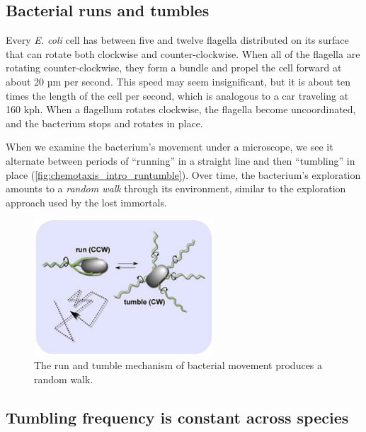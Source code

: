 \subsection{Bacterial runs and tumbles}


Every \textit{E. coli} cell has between five and twelve flagella distributed on its surface that can rotate both clockwise and counter-clockwise. When all of the flagella are rotating counter-clockwise, they form a bundle and propel the cell forward at about 20 µm per second. This speed may seem insignificant, but it is about ten times the length of the cell per second, which is analogous to a car traveling at 160 kph. When a flagellum rotates clockwise, the flagella become uncoordinated, and the bacterium stops and rotates in place.

When we examine the bacterium's movement under a microscope, we see it alternate between periods of ``running'' in a straight line and then ``tumbling'' in place (\autoref{fig:chemotaxis_intro_runtumble}). Over time, the bacterium's  exploration amounts to a \textit{random walk} through its environment, similar to the exploration approach used by the lost immortals.\\

\begin{figure}[h]
\centering
\mySfFamily
\includegraphics[width = 0.6\textwidth]{../images/chemotaxis_intro_runtumble.png}
\caption{The run and tumble mechanism of bacterial movement produces a random walk.}
\label{fig:chemotaxis_intro_runtumble}
\end{figure}

\FloatBarrier
{}
\subsection{Tumbling frequency is constant across species}

